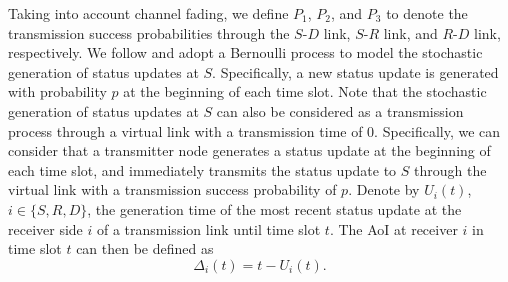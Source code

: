 \documentclass{IEEEtran}
\begin{document}
Taking into account channel fading, we define $P_{1}$, $P_{2}$, and $P_{3}$ to denote the transmission success probabilities through the $S$-$D$ link, $S$-$R$ link, and $R$-$D$ link, respectively. We follow \cite{b2} and adopt a Bernoulli process to model the stochastic generation of status updates at $S$. Specifically, a new status update is generated with probability $p$ at the beginning of each time slot. Note that the stochastic generation of status updates at $S$ can also be considered as a transmission process through a virtual link with a transmission time of 0. Specifically, we can consider that a transmitter node generates a status update at the beginning of each time slot,  and immediately transmits the status update to $S$ through the virtual link with a transmission success probability of $p$.
 Denote by $U_i(t)$, $i \in \{S, R, D\}$, the generation time of the most recent status update at the receiver side $i$ of a transmission link until time slot $t$. The AoI at receiver $i$ in time slot $t$ can then be defined as 
\begin{equation}
	\Delta_{i}(t)=t-U_{i}(t).
\end{equation}

\end{document}
